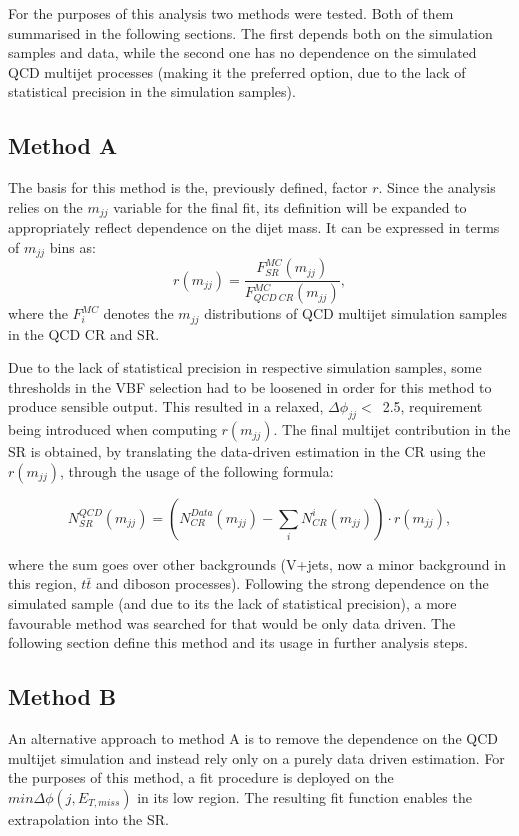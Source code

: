 \hspace{10pt} For the purposes of this analysis two methods were tested. Both of them summarised in the following sections. The first depends both on the simulation samples and data, while the second one has no dependence on the simulated QCD multijet processes (making it the preferred option, due to the lack of statistical precision in the simulation samples).

\subsection{Method A}
\hspace{10pt} The basis for this method is the, previously defined, factor $r$. Since the analysis relies on the $m_{jj}$ variable for the final fit, its definition will be expanded to appropriately reflect dependence on the dijet mass. It can be expressed in terms of $m_{jj}$ bins as: 
\begin{equation}
    r(m_{jj}) = \frac{F_{SR}^{MC}(m_{jj})}{F_{QCD~CR}^{MC}(m_{jj})},
\end{equation}
where the $F^{MC}_i$ denotes the $m_{jj}$ distributions of QCD multijet simulation samples in the QCD CR and SR.

\hspace{10pt} Due to the lack of statistical precision in respective simulation samples, some thresholds in the VBF selection had to be loosened in order for this method to produce sensible output. This resulted in a relaxed, $\Delta\phi_{jj}<$~2.5, requirement being introduced when computing $r(m_{jj})$. The final multijet contribution in the SR is obtained, by translating the data-driven estimation in the CR using the $r(m_{jj})$, through the usage of the following formula:

\begin{equation}
    N_{SR}^{QCD}(m_{jj}) = \left( N_{CR}^{Data}(m_{jj}) - \sum_i N^i_{CR}(m_{jj})\right)\cdot r(m_{jj}),
\end{equation}

where the sum goes over other backgrounds (V+jets, now a minor background in this region, $t\bar{t}$ and diboson processes). Following the strong dependence on the simulated sample (and due to its the lack of statistical precision), a more favourable method was searched for that would be only data driven. The following section define this method and its usage in further analysis steps.

\subsection{Method B}
\hspace{10pt} An alternative approach to method A is to remove the dependence on the QCD multijet simulation and instead rely only on a purely data driven estimation. For the purposes of this method, a fit procedure is deployed on the $min\Delta\phi(j, E_{T, miss})$ in its low region. The resulting fit function enables the extrapolation into the SR.

